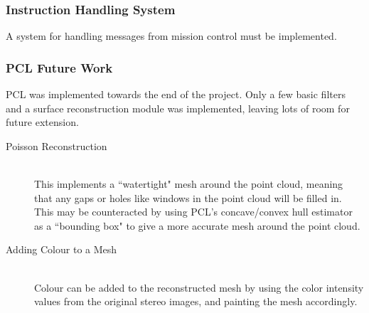 \subsubsection{Instruction Handling System}
A system for handling messages from mission control must be implemented.

\subsubsection{PCL Future Work}
PCL was implemented towards the end of the project. Only a few basic filters and a surface reconstruction module was implemented, leaving lots of room for future extension.
\begin{description}
\item[Poisson Reconstruction]\hfill \\
This implements a ``watertight" mesh around the point cloud, meaning that any gaps or holes like windows in the point cloud will be filled in. This may be counteracted by using PCL's concave/convex hull estimator as a ``bounding box" to give a more accurate mesh around the point cloud.
\item[Adding Colour to a Mesh]\hfill \\
Colour can be added to the reconstructed mesh by using the color intensity values from the original stereo images, and painting the mesh accordingly.
\end{description}



